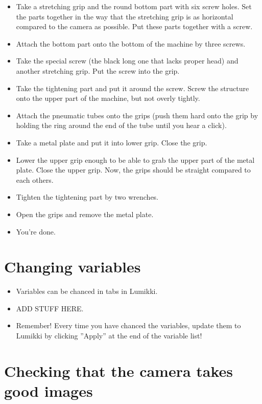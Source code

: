 \documentclass[a4paper]{article}
\begin{document}
\begin{itemize}
  \item Take a stretching grip and the round bottom part with six screw holes. Set the parts together in the way that the stretching grip is as horizontal compared to the camera as possible. Put these parts together with a screw.
  \item Attach the bottom part onto the bottom of the machine by three screws.
  \item Take the special screw (the black long one that lacks proper head) and another stretching grip. Put the screw into the grip.
  \item Take the tightening part and put it around the screw. Screw the structure onto the upper part of the machine, but not overly tightly.
  \item Attach the pneumatic tubes onto the grips (push them hard onto the grip by holding the ring around the end of the tube until you hear a click).
  \item Take a metal plate and put it into lower grip. Close the grip.
  \item Lower the upper grip enough to be able to grab the upper part of the metal plate. Close the upper grip. Now, the grips should be straight compared to each others.
  \item Tighten the tightening part by two wrenches.
  \item Open the grips and remove the metal plate.
  \item You're done.
\end{itemize}

\section{Changing variables}

\begin{itemize}
  \item Variables can be chanced in tabs in Lumikki.
  \item ADD STUFF HERE.
  \item Remember! Every time you have chanced the variables, update them to Lumikki by clicking ''Apply'' at the end of the variable list!
\end{itemize}

\section{Checking that the camera takes good images}
\end{document}
